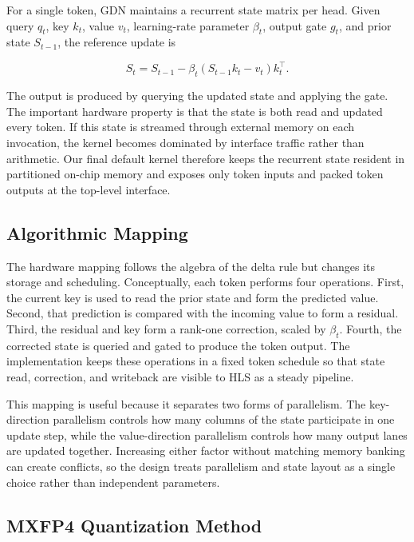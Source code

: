 \documentclass[conference]{IEEEtran}
\begin{document}
For a single token, GDN maintains a recurrent state matrix per head. Given query
$q_t$, key $k_t$, value $v_t$, learning-rate parameter $\beta_t$, output gate
$g_t$, and prior state $S_{t-1}$, the reference update is

\begin{equation}
S_t = S_{t-1} - \beta_t (S_{t-1} k_t - v_t) k_t^\top.
\end{equation}

The output is produced by querying the updated state and applying the gate. The
important hardware property is that the state is both read and updated every
token. If this state is streamed through external memory on each invocation, the
kernel becomes dominated by interface traffic rather than arithmetic. Our final
default kernel therefore keeps the recurrent state resident in partitioned
on-chip memory and exposes only token inputs and packed token outputs at the
top-level interface.

\subsection{Algorithmic Mapping}

The hardware mapping follows the algebra of the delta rule but changes its
storage and scheduling. Conceptually, each token performs four operations.
First, the current key is used to read the prior state and form the predicted
value. Second, that prediction is compared with the incoming value to form a
residual. Third, the residual and key form a rank-one correction, scaled by
$\beta_t$. Fourth, the corrected state is queried and gated to produce the token
output. The implementation keeps these operations in a fixed token schedule so
that state read, correction, and writeback are visible to HLS as a steady
pipeline.

This mapping is useful because it separates two forms of parallelism. The
key-direction parallelism controls how many columns of the state participate in
one update step, while the value-direction parallelism controls how many output
lanes are updated together. Increasing either factor without matching memory
banking can create conflicts, so the design treats parallelism and state layout
as a single choice rather than independent parameters.

\subsection{MXFP4 Quantization Method}
\end{document}
